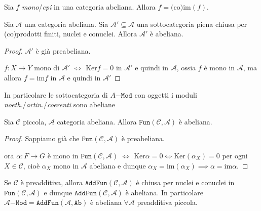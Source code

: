 \begin{corollary}{}
    Sia \(f\) \emph{mono}/\emph{epi} in una categoria abeliana. Allora \(f = \text{(co)}\mathrm{im}{(f)}\).
\end{corollary}


\begin{proposition}{}
    Sia \(\mathcal{A}\) una categoria abeliana. Sia \(\mathcal{A}' \subseteq
    \mathcal{A}\) una sottocategoria piena chiusa per (co)prodotti finiti,
    nuclei e conuclei. Allora \(\mathcal{A}'\) è abeliana.
\end{proposition}
\begin{proof}{}
    \(\mathcal{A}'\) è già preabeliana.

    \(f : X \to Y\) mono di \(\mathcal{A}'\) \(\iff\) \(\mathrm{Ker}f = 0\) in
    \(\mathcal{A}'\) e quindi in \(\mathcal{A}\), ossia \(f\) è mono in \(\mathcal{A}\), ma allora \(f = \mathrm{im}f \) in \(\mathcal{A}\) e quindi in \(\mathcal{A}'\) 
\end{proof}

\begin{example}{}
    In particolare le sottocategoria di \(A\mathtt{-Mod}\) con oggetti i moduli
    \emph{noeth.}/\emph{artin.}/\emph{coerenti} sono abeliane
\end{example}

\begin{example}{}
    Sia \(\mathcal{C}\) piccola, \(\mathcal{A}\) categoria abeliana. Allora \(\mathtt{Fun}{(\mathcal{C}, \mathcal{A})}\) è abeliana.
    \begin{proof}{}
        Sappiamo già che \(\mathtt{Fun}{(\mathcal{C},\mathcal{A})}\) è
        preabeliana.

        ora \(\alpha : F \to G\) è mono in \(\mathtt{Fun}{(\mathcal{C}, \mathcal{A})}\) \(\iff\) \(\mathrm{Ker}\alpha = 0 \iff \mathrm{Ker}{(\alpha_X)} = 0\) per ogni \(X \in \mathcal{C}\), cioè \(\alpha_X\) mono in \(\mathcal{A}\) abeliana e dunque \(\alpha_X = \mathrm{im}{(\alpha_X)} \implies \alpha = \mathrm{im}\alpha\).
    \end{proof}

    Se \(\mathcal{C}\) è preadditiva, allora \(\mathtt{AddFun}{(\mathcal{C},\mathcal{A})}\) è chiusa per 
    nuclei e conuclei in \(\mathtt{Fun}{(\mathcal{C}, \mathcal{A})}\) e dunque
    \(\mathtt{AddFun}{(\mathcal{C},\mathcal{A})}\) è abeliana.
    In particolare \(\mathcal{A}\mathtt{-Mod} = \mathtt{AddFun}{(\mathcal{A}, \mathtt{Ab})}\) è abeliana \(\forall \mathcal{A}\) preadditiva piccola.
\end{example}

